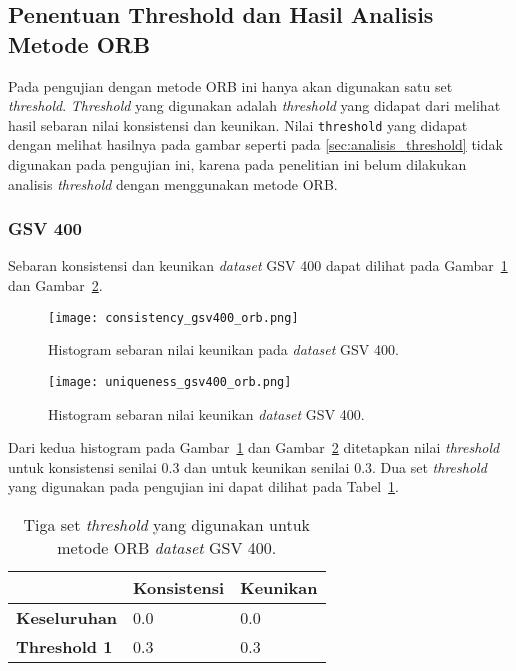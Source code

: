 \subsection{Penentuan Threshold dan Hasil Analisis Metode ORB}
Pada pengujian dengan metode ORB ini hanya akan digunakan satu set \textit{threshold}. \textit{Threshold} yang digunakan adalah \textit{threshold} yang didapat dari melihat hasil sebaran nilai konsistensi dan keunikan. Nilai \texttt{threshold} yang didapat dengan melihat hasilnya pada gambar seperti pada \ref{sec:analisis_threshold} tidak digunakan pada pengujian ini, karena pada penelitian ini belum dilakukan analisis \textit{threshold} dengan menggunakan metode ORB. 

\subsubsection{GSV 400}
Sebaran konsistensi dan keunikan \textit{dataset} GSV 400 dapat dilihat pada Gambar~\ref{fig:consistency_gsv400_pengujian_orb} dan Gambar~\ref{fig:uniqueness_gsv400_pengujian_orb}.
\vspace{-20pt}
\begin{figure}[H]
	\centering
	\texttt{[image: consistency\_gsv400\_orb.png]}
	\caption{Histogram sebaran nilai keunikan pada \textit{dataset} GSV 400.}
	\label{fig:consistency_gsv400_pengujian_orb}
\end{figure}
\vspace{-10pt}
\begin{figure}[H]
	\centering
	\texttt{[image: uniqueness\_gsv400\_orb.png]}
	\caption{Histogram sebaran nilai keunikan \textit{dataset} GSV 400.}
	\label{fig:uniqueness_gsv400_pengujian_orb}
\end{figure}
Dari kedua histogram pada Gambar~\ref{fig:consistency_gsv400_pengujian_orb} dan Gambar~\ref{fig:uniqueness_gsv400_pengujian_orb} ditetapkan nilai \textit{threshold} untuk konsistensi senilai 0.3 dan untuk keunikan senilai 0.3. Dua set \textit{threshold} yang digunakan pada pengujian ini dapat dilihat pada Tabel~\ref{tab:threshold_gsv400_orb}.
\begin{table}[H]
	\centering
	\begin{tabular}{|l|l|l|}
		\hline
		& \textbf{Konsistensi} & \textbf{Keunikan} \\ \hline
		\textbf{Keseluruhan} & 0.0                  & 0.0               \\ \hline
		\textbf{Threshold 1} & 0.3                  & 0.3               \\ \hline
	\end{tabular}
	\caption{Tiga set \textit{threshold} yang digunakan untuk metode ORB \textit{dataset} GSV 400.}
	\label{tab:threshold_gsv400_orb}
\end{table}

